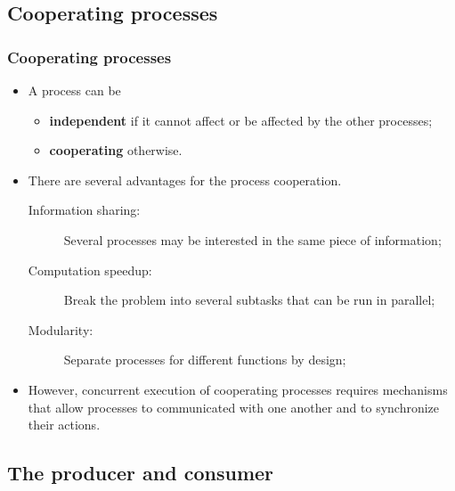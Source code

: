 \documentclass[CJKutf8,xcolor=pdftex,dvipsnames,table]{beamer}
\begin{document}
\begin{CJK*}{UTF8}{song}
  \section{Cooperating processes}

  \begin{frame}
  \frametitle{Cooperating processes} \pause
  \begin{itemize}
  \item{A process can be} \pause
    \begin{itemize}
    \item{\textbf{independent} if it cannot affect or be affected by the other processes;} \pause
    \item{\textbf{cooperating} otherwise.} \pause
    \end{itemize}
  \item{There are several advantages for the process cooperation.} \pause
    \begin{description}
    \item[Information sharing:]{Several processes may be interested in the same piece of information;} \pause
    \item[Computation speedup:]{Break the problem into several subtasks that can be run in parallel;} \pause
    \item[Modularity:]{Separate processes for different functions by design;} \pause
    \end{description}
  \item{However, concurrent execution of cooperating processes requires mechanisms that allow processes to communicated with one another and to synchronize their actions.}
  \end{itemize}
  \end{frame}

  \subsection{The producer and consumer}


\end{CJK*}
\end{document}
